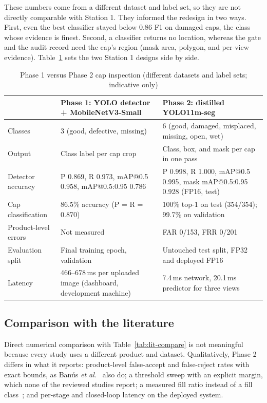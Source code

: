 These numbers come from a different dataset and label set, so they are not directly comparable with Station 1. They informed the redesign in two ways. First, even the best classifier stayed below 0.86 F1 on damaged caps, the class whose evidence is finest. Second, a classifier returns no location, whereas the gate and the audit record need the cap's region (mask area, polygon, and per-view evidence). Table~\ref{tab:phase-compare} sets the two Station 1 designs side by side.

\begin{table}[htbp]
\centering
\caption{Phase 1 versus Phase 2 cap inspection (different datasets and label sets; indicative only)}
\label{tab:phase-compare}
\footnotesize
\begin{tabularx}{\textwidth}{|p{3.3cm}|X|X|}
\hline
 & \textbf{Phase 1: YOLO detector + MobileNetV3-Small} & \textbf{Phase 2: distilled YOLO11m-seg} \\ \hline
Classes & 3 (good, defective, missing) & 6 (good, damaged, misplaced, missing, open, wet) \\ \hline
Output & Class label per cap crop & Class, box, and mask per cap in one pass \\ \hline
Detector accuracy & P 0.869, R 0.973, mAP@0.5 0.958, mAP@0.5:0.95 0.786 & P 0.998, R 1.000, mAP@0.5 0.995, mask mAP@0.5:0.95 0.928 (FP16, test) \\ \hline
Cap classification & 86.5\% accuracy (P = R = 0.870) & 100\% top-1 on test (354/354); 99.7\% on validation \\ \hline
Product-level errors & Not measured & FAR 0/153, FRR 0/201 \\ \hline
Evaluation split & Final training epoch, validation & Untouched test split, FP32 and deployed FP16 \\ \hline
Latency & 466--678\,ms per uploaded image (dashboard, development machine) & 7.4\,ms network, 20.1\,ms predictor for three views \\ \hline
\end{tabularx}
\end{table}

\subsection{Comparison with the literature}
Direct numerical comparison with Table~\ref{tab:lit-compare} is not meaningful because every study uses a different product and dataset. Qualitatively, Phase 2 differs in what it reports: product-level false-accept and false-reject rates with exact bounds, as Ban\'us \textit{et al.}~\cite{banus2021} also do; a threshold sweep with an explicit margin, which none of the reviewed studies report; a measured fill ratio instead of a fill class~\cite{chatchapol2024}; and per-stage and closed-loop latency on the deployed system.


